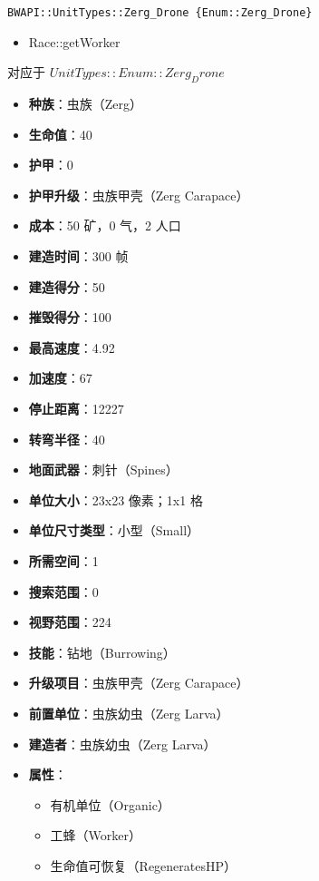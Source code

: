 \begin{tcolorbox}[colback=white, colframe=black!60!white, title=Zerg\_Drone(), arc=0mm]
    \begin{verbatim}
BWAPI::UnitTypes::Zerg_Drone {Enum::Zerg_Drone}
    \end{verbatim}
    \begin{refer}
        \begin{itemize}
            \item Race::getWorker
        \end{itemize}
    \end{refer}
    对应于  $ UnitTypes::Enum::Zerg_Drone $ 
    \begin{itemize}
        \item \textbf{种族}：虫族（Zerg）
        \item \textbf{生命值}：40
        \item \textbf{护甲}：0
        \item \textbf{护甲升级}：虫族甲壳（Zerg Carapace）
        \item \textbf{成本}：50 矿，0 气，2 人口
        \item \textbf{建造时间}：300 帧
        \item \textbf{建造得分}：50
        \item \textbf{摧毁得分}：100
        \item \textbf{最高速度}：4.92
        \item \textbf{加速度}：67
        \item \textbf{停止距离}：12227
        \item \textbf{转弯半径}：40
        \item \textbf{地面武器}：刺针（Spines）
        \item \textbf{单位大小}：23x23 像素；1x1 格
        \item \textbf{单位尺寸类型}：小型（Small）
        \item \textbf{所需空间}：1
        \item \textbf{搜索范围}：0
        \item \textbf{视野范围}：224
        \item \textbf{技能}：钻地（Burrowing）
        \item \textbf{升级项目}：虫族甲壳（Zerg Carapace）
        \item \textbf{前置单位}：虫族幼虫（Zerg Larva）
        \item \textbf{建造者}：虫族幼虫（Zerg Larva）
        \item \textbf{属性}：
            \begin{itemize}
                \item 有机单位（Organic）
                \item 工蜂（Worker）
                \item 生命值可恢复（RegeneratesHP）
            \end{itemize}
    \end{itemize}
\end{tcolorbox}

